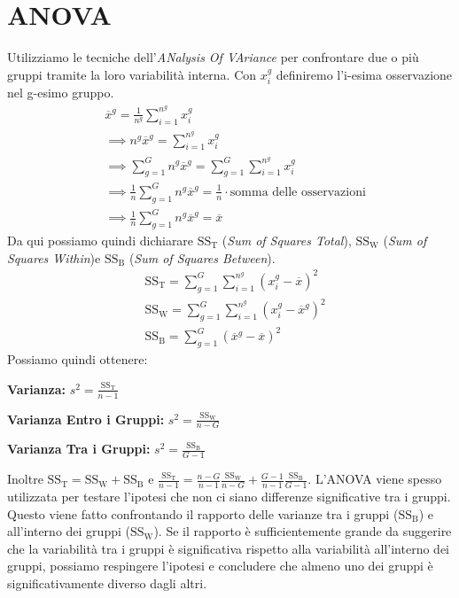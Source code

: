 \documentclass[11pt]{report}
\begin{document}
\section{ANOVA}
Utilizziamo le tecniche dell'\textit{ANalysis Of VAriance} per confrontare due o più gruppi tramite la loro variabilità interna. Con $x_i^g$ definiremo l'i-esima osservazione nel g-esimo gruppo.
\begin{equation}
    \begin{split}
        & \overline{x}^g = \frac{1}{n^g}\sum_{i=1}^{n^g}x_i^g\\
        & \implies n^g\overline{x}^g  = \sum_{i=1}^{n^g}x_i^g\\
        & \implies \sum_{g=1}^{G}n^g\overline{x}^g = \sum_{g=1}^{G}\sum_{i=1}^{n^g}x_i^g\\
        & \implies \frac{1}{n}\sum_{g=1}^{G}n^g\overline{x}^g = \frac{1}{n} \cdot \text{somma delle osservazioni}\\
        & \implies \frac{1}{n}\sum_{g=1}^{G}n^g\overline{x}^g = \overline{x}
    \end{split}
\end{equation}
Da qui possiamo quindi dichiarare $\text{SS}_\text{T}$ (\textit{Sum of Squares Total}), $\text{SS}_\text{W}$ (\textit{Sum of Squares Within})e $\text{SS}_\text{B}$ (\textit{Sum of Squares Between}).
\begin{equation}
    \begin{split}
        & \text{SS}_\text{T} = \sum_{g=1}^{G}\sum_{i=1}^{n^g}(x_i^g - \overline{x})^2\\
        & \text{SS}_\text{W} = \sum_{g=1}^{G}\sum_{i=1}^{n^g}(x_i^g - \overline{x}^g)^2\\
        & \text{SS}_\text{B} = \sum_{g=1}^{G}(\overline{x}^g - \overline{x})^2
    \end{split}
\end{equation}
Possiamo quindi ottenere:
\begin{description}
	\item \textbf{Varianza:} $s^2 = \frac{\text{SS}_\text{T}}{n-1}$
	\item \textbf{Varianza Entro i Gruppi:} $s^2 = \frac{\text{SS}_\text{W}}{n-G}$
	\item \textbf{Varianza Tra i Gruppi:} $s^2 = \frac{\text{SS}_\text{B}}{G-1}$
\end{description}
Inoltre $\text{SS}_\text{T} = \text{SS}_\text{W} + \text{SS}_\text{B}$ e $\frac{\text{SS}_\text{T}}{n-1} = \frac{n-G}{n-1}\frac{\text{SS}_\text{W}}{n-G} + \frac{G-1}{n-1}\frac{\text{SS}_\text{B}}{G-1}$.
L'ANOVA viene spesso utilizzata per testare l'ipotesi che non ci siano differenze significative tra i gruppi. Questo viene fatto confrontando il rapporto delle varianze tra i gruppi ($\text{SS}_\text{B}$) e all'interno dei gruppi ($\text{SS}_\text{W}$). Se il rapporto è sufficientemente grande da suggerire che la variabilità tra i gruppi è significativa rispetto alla variabilità all'interno dei gruppi, possiamo respingere l'ipotesi e concludere che almeno uno dei gruppi è significativamente diverso dagli altri.
\end{document}
